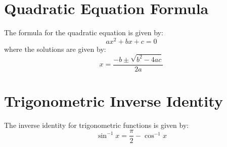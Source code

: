 \documentclass{article}
\begin{document}
\section{Quadratic Equation Formula}
The formula for the quadratic equation is given by:
\begin{equation}
ax^2 + bx + c = 0
\end{equation}
where the solutions are given by:
\begin{equation}
x = \frac{-b \pm \sqrt{b^2 - 4ac}}{2a}
\end{equation}

\section{Trigonometric Inverse Identity}
The inverse identity for trigonometric functions is given by:
\begin{equation}
\sin^{-1} x = \frac{\pi}{2} - \cos^{-1} x
\end{equation}
\end{document}
